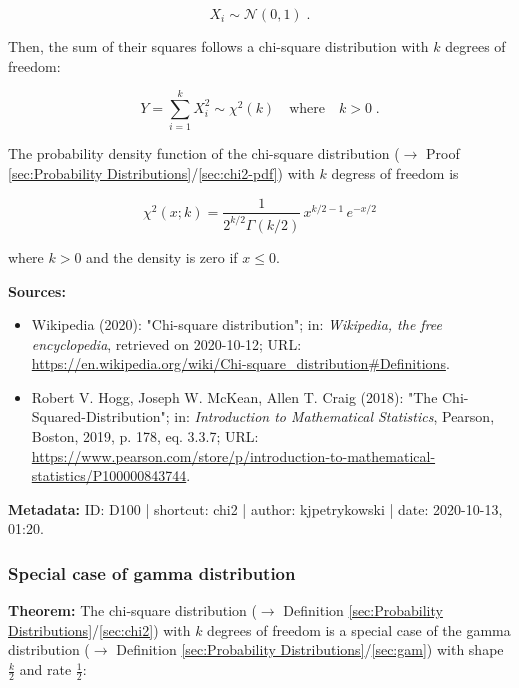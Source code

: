 \documentclass[a4paper,12pt,twoside]{book}
\begin{document}
\begin{equation} \label{eq:chi2-snorm}
X_{i} \sim \mathcal{N}(0,1) \; .
\end{equation}

Then, the sum of their squares follows a chi-square distribution with $k$ degrees of freedom:

\begin{equation}\label{eq:chi2-chi2}
Y = \sum_{i=1}^{k} X_{i}^{2} \sim \chi^{2}(k) \quad \text{where} \quad k > 0 \; .
\end{equation}

The probability density function of the chi-square distribution ($\rightarrow$ Proof \ref{sec:Probability Distributions}/\ref{sec:chi2-pdf}) with $k$ degress of freedom is

\begin{equation} \label{eq:chi2-chi2-pdf}
\chi^{2}(x; k) = \frac{1}{2^{k/2}\Gamma (k/2)} \, x^{k/2-1} \, e^{-x/2}
\end{equation}

where $k > 0$ and the density is zero if $x \leq 0$.


\vspace{1em}
\textbf{Sources:}
\begin{itemize}
\item Wikipedia (2020): "Chi-square distribution"; in: \textit{Wikipedia, the free encyclopedia}, retrieved on 2020-10-12; URL: \url{https://en.wikipedia.org/wiki/Chi-square_distribution#Definitions}.
\item Robert V. Hogg, Joseph W. McKean, Allen T. Craig (2018): "The Chi-Squared-Distribution"; in: \textit{Introduction to Mathematical Statistics}, Pearson, Boston, 2019, p. 178, eq. 3.3.7; URL: \url{https://www.pearson.com/store/p/introduction-to-mathematical-statistics/P100000843744}.
\end{itemize}


\vspace{1em}
\textbf{Metadata:} ID: D100 | shortcut: chi2 | author: kjpetrykowski | date: 2020-10-13, 01:20.
\vspace{1em}



\subsubsection[\textbf{Special case of gamma distribution}]{Special case of gamma distribution} \label{sec:chi2-gam}
\setcounter{equation}{0}

\textbf{Theorem:} The chi-square distribution ($\rightarrow$ Definition \ref{sec:Probability Distributions}/\ref{sec:chi2}) with $k$ degrees of freedom is a special case of the gamma distribution ($\rightarrow$ Definition \ref{sec:Probability Distributions}/\ref{sec:gam}) with shape $\frac{k}{2}$ and rate $\frac{1}{2}$:
\end{document}
